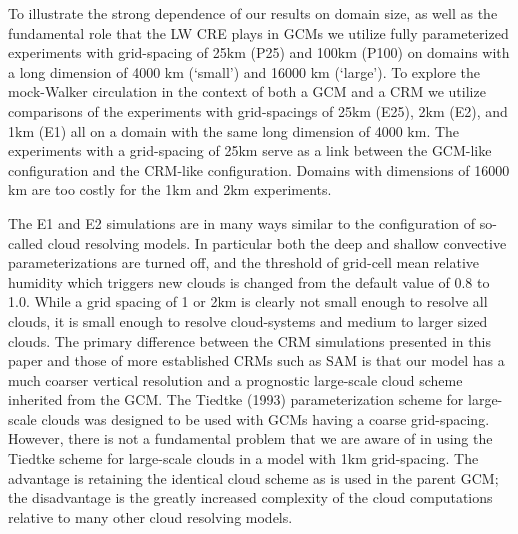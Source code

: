 \documentclass[11pt]{article}   	%
\begin{document}
To illustrate the strong dependence of our results on domain size, as well as the fundamental role that the LW CRE plays in GCMs
we utilize fully parameterized experiments with grid-spacing of 25km (P25) and 100km (P100) on domains with a long dimension 
of 4000 km (`small') and
16000 km (`large').  To explore the mock-Walker circulation in the context of both a GCM and a CRM we utilize 
comparisons of the experiments with grid-spacings of 25km (E25), 2km (E2), and 1km (E1) all on a domain with the same long dimension 
of 4000 km.  The experiments with a grid-spacing of 25km serve as a link between the GCM-like configuration and the CRM-like 
configuration.  Domains with dimensions of 16000 km are too costly for the 1km and 2km experiments.

The E1 and E2 simulations are in many ways similar to the configuration of so-called cloud resolving models.  
In particular both the deep and shallow convective parameterizations are turned off, and the threshold of grid-cell mean relative humidity 
which triggers new clouds is changed from the default value of 0.8 to 1.0.  While a grid spacing of 1 or 2km is clearly not small enough
to resolve all clouds, it is small enough to resolve cloud-systems and medium to larger sized clouds.  The primary 
difference between the CRM simulations presented in this paper and those of more established CRMs such as SAM is that our model
has a much coarser vertical resolution and a prognostic large-scale cloud scheme inherited from the GCM.  The Tiedtke (1993) 
parameterization scheme for large-scale 
clouds was designed to be used with GCMs having a coarse grid-spacing.  However, there is not a fundamental problem that we are 
aware of in using the Tiedtke scheme for large-scale clouds in a model with 1km grid-spacing.   The advantage is retaining the 
identical cloud scheme as is used in the parent GCM; the disadvantage is the greatly increased complexity of the cloud computations 
relative to many other cloud resolving models.    
\end{document}
